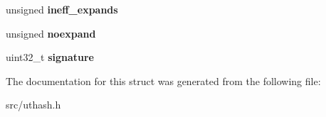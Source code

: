 \begin{DoxyCompactItemize}
\item 
\hypertarget{structUT__hash__table_a216c7d98cf40a0064bee94aa8a5bf1b7}{unsigned {\bfseries ineff\+\_\+expands}}\label{structUT__hash__table_a216c7d98cf40a0064bee94aa8a5bf1b7}

\item 
\hypertarget{structUT__hash__table_a635661789933752e7b83dac84430eae1}{unsigned {\bfseries noexpand}}\label{structUT__hash__table_a635661789933752e7b83dac84430eae1}

\item 
\hypertarget{structUT__hash__table_a87d1ab3f3ede1809c6a485972d20b25f}{uint32\+\_\+t {\bfseries signature}}\label{structUT__hash__table_a87d1ab3f3ede1809c6a485972d20b25f}

\end{DoxyCompactItemize}


The documentation for this struct was generated from the following file\+:\begin{DoxyCompactItemize}
\item 
src/uthash.\+h\end{DoxyCompactItemize}
